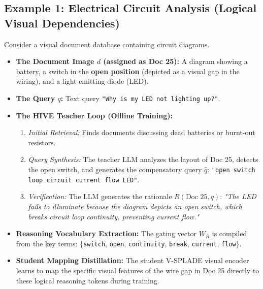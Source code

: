 \documentclass[11pt,a4paper]{article}
\begin{document}
\subsection{Example 1: Electrical Circuit Analysis (Logical Visual Dependencies)}
Consider a visual document database containing circuit diagrams.
\begin{itemize}
    \item \textbf{The Document Image $d$ (assigned as Doc 25):} A diagram showing a battery, a switch in the \textbf{open position} (depicted as a visual gap in the wiring), and a light-emitting diode (LED).
    \item \textbf{The Query $q$:} Text query \texttt{"Why is my LED not lighting up?"}.
    \item \textbf{The HIVE Teacher Loop (Offline Training):}
    \begin{enumerate}
        \item \textit{Initial Retrieval:} Finds documents discussing dead batteries or burnt-out resistors.
        \item \textit{Query Synthesis:} The teacher LLM analyzes the layout of Doc 25, detects the open switch, and generates the compensatory query $\hat{q}$: \texttt{"open switch loop circuit current flow LED"}.
        \item \textit{Verification:} The LLM generates the rationale $R(\text{Doc 25}, q)$: \textit{"The LED fails to illuminate because the diagram depicts an open switch, which breaks circuit loop continuity, preventing current flow."}
    \end{enumerate}
    \item \textbf{Reasoning Vocabulary Extraction:} The gating vector $W_R$ is compiled from the key terms: \{\texttt{switch}, \texttt{open}, \texttt{continuity}, \texttt{break}, \texttt{current}, \texttt{flow}\}.
    \item \textbf{Student Mapping Distillation:} The student V-SPLADE visual encoder learns to map the specific visual features of the wire gap in Doc 25 directly to these logical reasoning tokens during training.
    

\end{itemize}
\end{document}
